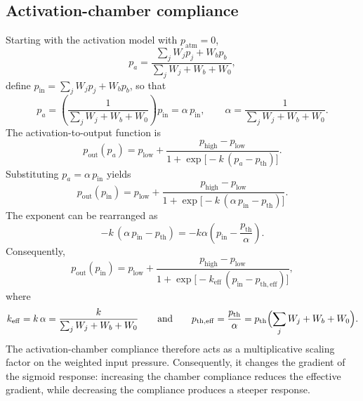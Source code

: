 \documentclass[11pt,a4paper]{article}
\numberwithin{equation}{section}
\newcommand{\pin}{p_{\mathrm{in}}}
\newcommand{\pout}{p_{\mathrm{out}}}
\newcommand{\patm}{p_{\mathrm{atm}}}
\newcommand{\plow}{p_{\mathrm{low}}}
\newcommand{\phigh}{p_{\mathrm{high}}}
\newcommand{\pth}{p_{\mathrm{th}}}
\begin{document}
\begin{appendices}
\section{Activation-chamber compliance}
\label{app:compliance}

Starting with the activation model with $\patm = 0$,
\begin{equation}
  p_a = \frac{\sum_j W_j p_j + W_b p_b}{\sum_j W_j + W_b + W_0},
\end{equation}
define $\pin = \sum_j W_j p_j + W_b p_b$, so that
\begin{equation}
  p_a = \left(\frac{1}{\sum_j W_j + W_b + W_0}\right)\pin = \alpha\,\pin,
  \qquad \alpha = \frac{1}{\sum_j W_j + W_b + W_0} .
\end{equation}
The activation-to-output function is
\begin{equation}
  \pout(p_a) = \plow + \frac{\phigh - \plow}{1 + \exp\bigl[-k\,(p_a - \pth)\bigr]} .
\end{equation}
Substituting $p_a = \alpha\,\pin$ yields
\begin{equation}
  \pout(\pin) = \plow + \frac{\phigh - \plow}{1 + \exp\bigl[-k\,(\alpha\,\pin - \pth)\bigr]} .
\end{equation}
The exponent can be rearranged as
\begin{equation}
  -k\,(\alpha\,\pin - \pth) = -k\alpha\left(\pin - \frac{\pth}{\alpha}\right) .
\end{equation}
Consequently,
\begin{equation}
  \pout(\pin) = \plow + \frac{\phigh - \plow}{1 + \exp\bigl[-k_{\mathrm{eff}}\,(\pin - p_{\mathrm{th,eff}})\bigr]},
\end{equation}
where
\begin{equation}
  k_{\mathrm{eff}} = k\,\alpha = \frac{k}{\sum_j W_j + W_b + W_0}
  \qquad\text{and}\qquad
  p_{\mathrm{th,eff}} = \frac{\pth}{\alpha} = \pth\Bigl(\sum_j W_j + W_b + W_0\Bigr) .
\end{equation}
The activation-chamber compliance therefore acts as a multiplicative scaling factor on the weighted input pressure.
Consequently, it changes the gradient of the sigmoid response: increasing the chamber compliance reduces the
effective gradient, while decreasing the compliance produces a steeper response.


\end{appendices}
\end{document}
